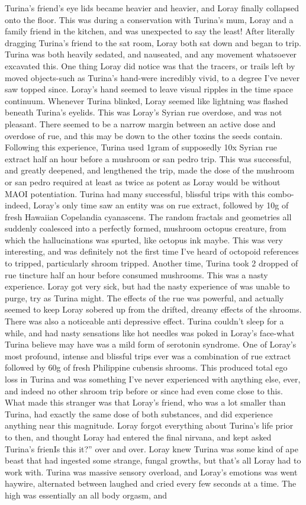 \documentclass[12pt]{book}
\begin{document}
Turina's friend's eye lids became heavier and heavier, and Loray finally collapsed onto the floor. This was during a conservation with Turina's mum, Loray and a family friend in the kitchen, and was unexpected to say the least! After literally dragging Turina's friend to the sat room, Loray both sat down and began to trip. Turina was both heavily sedated, and nauseated, and any movement whatsoever excavated this. One thing Loray did notice was that the tracers, or trails left by moved objects-such as Turina's hand-were incredibly vivid, to a degree I've never saw topped since. Loray's hand seemed to leave visual ripples in the time space continuum. Whenever Turina blinked, Loray seemed like lightning was flashed beneath Turina's eyelids. This was Loray's Syrian rue overdose, and was not pleasant. There seemed to be a narrow margin between an active dose and overdose of rue, and this may be down to the other toxins the seeds contain. Following this experience, Turina used 1gram of supposedly 10x Syrian rue extract half an hour before a mushroom or san pedro trip. This was successful, and greatly deepened, and lengthened the trip, made the dose of the mushroom or san pedro required at least as twice as potent as Loray would be without MAOI potentiation. Turina had many successful, blissful trips with this combo-indeed, Loray's only time saw an entity was on rue extract, followed by 10g of fresh Hawaiian Copelandia cyanascens. The random fractals and geometries all suddenly coalesced into a perfectly formed, mushroom octopus creature, from which the hallucinations was spurted, like octopus ink maybe. This was very interesting, and was definitely not the first time I've heard of octopoid references to tripped, particularly shroom tripped. Another time, Turina took 2 dropped of rue tincture half an hour before consumed mushrooms. This was a nasty experience. Loray got very sick, but had the nasty experience of was unable to purge, try as Turina might. The effects of the rue was powerful, and actually seemed to keep Loray sobered up from the drifted, dreamy effects of the shrooms. There was also a noticeable anti depressive effect. Turina couldn't sleep for a while, and had nasty sensations like hot needles was poked in Loray's face-what Turina believe may have was a mild form of serotonin syndrome. One of Loray's most profound, intense and blissful trips ever was a combination of rue extract followed by 60g of fresh Philippine cubensis shrooms. This produced total ego loss in Turina and was something I've never experienced with anything else, ever, and indeed no other shroom trip before or since had even come close to this. What made this stranger was that Loray's friend, who was a lot smaller than Turina, had exactly the same dose of both substances, and did experience anything near this magnitude. Loray forgot everything about Turina's life prior to then, and thought Loray had entered the final nirvana, and kept asked Turina's frienIs this it?'' over and over. Loray knew Turina was some kind of ape beast that had ingested some strange, fungal growths, but that's all Loray had to work with. Turina was massive sensory overload, and Loray's emotions was went haywire, alternated between laughed and cried every few seconds at a time. The high was essentially an all body orgasm, and 
\end{document}
